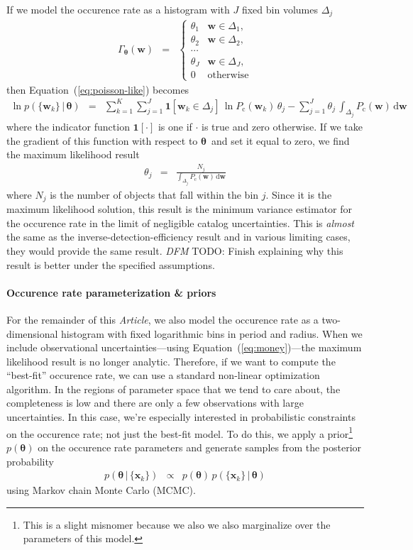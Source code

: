 \documentclass[12pt,preprint]{aastex}
\newcommand{\paper}{\textsl{Article}}
\newcommand{\Eq}[1]{Equation~(\ref{eq:#1})}
\newcommand{\eq}[1]{\Eq{#1}}
\newcommand{\eqlabel}[1]{\label{eq:#1}}
\newcommand{\dd}{\ensuremath{\,\mathrm{d}}}
\newcommand{\bvec}[1]{\ensuremath{\boldsymbol{#1}}}
\newcommand{\todo}[3]{{\color{#2} \emph{#1} TODO: #3}}
\newcommand{\dfmtodo}[1]{\todo{DFM}{red}{#1}}
\newcommand{\rate}{\ensuremath{\Gamma}}
\newcommand{\ratepar}{{\ensuremath{\theta}}}
\newcommand{\ratepars}{{\ensuremath{\bvec{\ratepar}}}}
\newcommand{\completeness}{{\ensuremath{P_\mathrm{c}}}}
\newcommand{\data}{{\ensuremath{\bvec{x}}}}
\newcommand{\entry}{{\ensuremath{\bvec{w}}}}
\newcommand{\binarea}{{\ensuremath{\Delta}}}
\begin{document}
If we model the occurence rate as a histogram with $J$ fixed bin volumes
$\binarea_j$
\begin{eqnarray}
\rate_\ratepars (\entry) &=& \left\{\begin{array}{ll}
\ratepar_1 & \entry \in \binarea_1,\\
\ratepar_2 & \entry \in \binarea_2,\\
\cdots \\
\ratepar_J & \entry \in \binarea_J,\\
0 & \mathrm{otherwise}
\end{array}\right.
\end{eqnarray}
then \eq{poisson-like} becomes
\begin{eqnarray}
\ln p(\{\entry_k\}\,|\,\ratepars) &=&
    \sum_{k=1}^K \sum_{j=1}^J \mathbf{1}[\entry_k \in
        \binarea_j]\,\ln\completeness(\entry_k)\,\ratepar_j
    -\sum_{j=1}^J\ratepar_j\,\int_{\binarea_j} \completeness(\entry)\dd\entry
\end{eqnarray}
where the indicator function $\mathbf{1}[\cdot]$ is one if $\cdot$ is true and
zero otherwise.
If we take the gradient of this function with respect to \ratepars\ and set it
equal to zero, we find the maximum likelihood result
\begin{eqnarray}
\ratepar_j &=& \frac{N_j}{\int_{\binarea_j} \completeness(\entry)\dd\entry}
\end{eqnarray}
where $N_j$ is the number of objects that fall within the bin $j$.
Since it is the maximum likelihood solution, this result is the minimum
variance estimator for the occurence rate in the limit of negligible catalog
uncertainties.
This is \emph{almost} the same as the inverse-detection-efficiency result and
in various limiting cases, they would provide the same result.
\dfmtodo{Finish explaining why this result is better under the specified
assumptions.}

\paragraph{Occurence rate parameterization \& priors}
For the remainder of this \paper, we also model the occurence rate as a
two-dimensional histogram with fixed logarithmic bins in period and radius.
When we include observational uncertainties---using \eq{money}---the maximum
likelihood result is no longer analytic.
Therefore, if we want to compute the ``best-fit'' occurence rate, we can use a
standard non-linear optimization algorithm.
In the regions of parameter space that we tend to care about, the completeness
is low and there are only a few observations with large uncertainties.
In this case, we're especially interested in probabilistic constraints on the
occurence rate; not just the best-fit model.
To do this, we apply a prior\footnote{This is a slight misnomer because
we also we also marginalize over the parameters of this model.} $p(\ratepars)$
on the occurence rate parameters and generate samples from the posterior
probability
\begin{eqnarray}\eqlabel{posterior}
p(\ratepars\,|\,\{\data_k\}) &\propto&
    p(\ratepars)\,p(\{\data_k\}\,|\,\ratepars)
\end{eqnarray}
using Markov chain Monte Carlo (MCMC).
\end{document}
